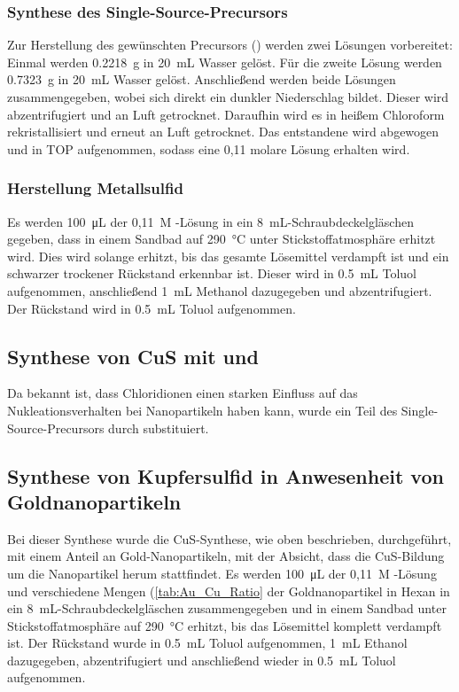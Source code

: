 	\subsubsection{Synthese des Single-Source-Precursors }
	Zur Herstellung des gewünschten Precursors () werden zwei Lösungen vorbereitet: 
	Einmal werden \SI{0,2218}{\gram}  in \SI{20}{\milli\liter} Wasser gelöst.
	Für die zweite Lösung werden \SI{0,7323}{\gram}  in \SI{20}{\milli\liter} Wasser gelöst.
	Anschließend werden beide Lösungen zusammengegeben, wobei sich direkt ein dunkler Niederschlag bildet.
	Dieser wird abzentrifugiert und an Luft getrocknet.
	Daraufhin wird es in heißem Chloroform rekristallisiert und erneut an Luft getrocknet.
	Das entstandene  wird abgewogen und in TOP aufgenommen, sodass eine 0,11 molare Lösung erhalten wird.
	
	\subsubsection{Herstellung Metallsulfid}
	Es werden \SI{100}{\micro\liter} der 0,11~M -Lösung in ein \SI{8}{\milli\liter}-Schraubdeckelgläschen gegeben, dass in einem Sandbad auf \SI{290}{\degreeCelsius} unter Stickstoffatmosphäre erhitzt wird.
	Dies wird solange erhitzt, bis das gesamte Lösemittel verdampft ist und ein schwarzer trockener Rückstand erkennbar ist.
	Dieser wird in \SI{0,5}{\milli\liter} Toluol aufgenommen, anschließend \SI{1}{\milli\liter} Methanol dazugegeben und abzentrifugiert.
	Der Rückstand wird in \SI{0,5}{\milli\liter} Toluol aufgenommen.
	
	\subsection{Synthese von CuS mit  und }
	Da bekannt ist, dass Chloridionen einen starken Einfluss auf das Nukleationsverhalten bei Nanopartikeln haben kann\autocite{Hinrichs2016}, wurde ein Teil des Single-Source-Precursors durch  substituiert.
	
	\subsection{Synthese von Kupfersulfid in Anwesenheit von Goldnanopartikeln}
	
	Bei dieser Synthese wurde die CuS-Synthese, wie oben beschrieben, durchgeführt, mit einem Anteil an Gold-Nanopartikeln, mit der Absicht, dass die CuS-Bildung um die Nanopartikel herum stattfindet.	
	Es werden \SI{100}{\micro\liter} der 0,11~M -Lösung und verschiedene Mengen (\cref{tab:Au_Cu_Ratio} der Goldnanopartikel in Hexan in ein \SI{8}{\milli\liter}-Schraubdeckelgläschen zusammengegeben und in einem Sandbad unter Stickstoffatmosphäre auf \SI{290}{\degreeCelsius} erhitzt, bis das Lösemittel komplett verdampft ist.
	Der Rückstand wurde in \SI{0,5}{\milli\liter} Toluol aufgenommen, \SI{1}{\milli\liter} Ethanol dazugegeben, abzentrifugiert und anschließend wieder in \SI{0,5}{\milli\liter} Toluol aufgenommen.
	
